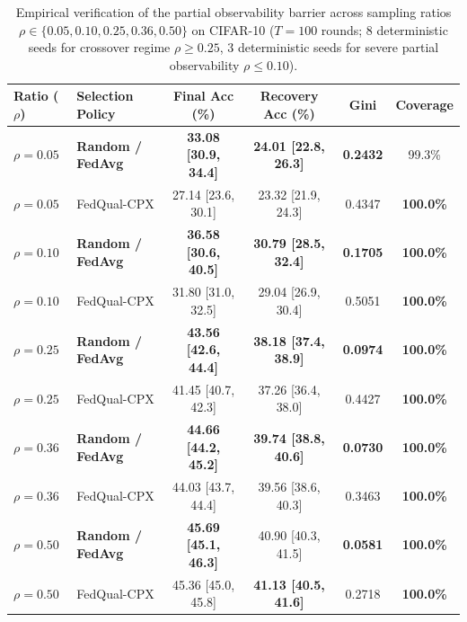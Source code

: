 \documentclass[conference]{IEEEtran}
\begin{document}
\begin{table}[h]
\centering
\caption{Empirical verification of the partial observability barrier across sampling ratios $\rho \in \{0.05, 0.10, 0.25, 0.36, 0.50\}$ on CIFAR-10 ($T=100$ rounds; 8 deterministic seeds for crossover regime $\rho \ge 0.25$, 3 deterministic seeds for severe partial observability $\rho \le 0.10$).}
\label{tab:kn_results}
\begin{tabular}{llcccc}
\toprule
Ratio ($\rho$) & Selection Policy & Final Acc (\%) & Recovery Acc (\%) & Gini & Coverage \\
\midrule
$\rho = 0.05$ & \textbf{Random / FedAvg} & \textbf{33.08 [30.9, 34.4]} & \textbf{24.01 [22.8, 26.3]} & \textbf{0.2432} & 99.3\% \\
$\rho = 0.05$ & FedQual-CPX & 27.14 [23.6, 30.1] & 23.32 [21.9, 24.3] & 0.4347 & \textbf{100.0\%} \\
$\rho = 0.10$ & \textbf{Random / FedAvg} & \textbf{36.58 [30.6, 40.5]} & \textbf{30.79 [28.5, 32.4]} & \textbf{0.1705} & \textbf{100.0\%} \\
$\rho = 0.10$ & FedQual-CPX & 31.80 [31.0, 32.5] & 29.04 [26.9, 30.4] & 0.5051 & \textbf{100.0\%} \\
$\rho = 0.25$ & \textbf{Random / FedAvg} & \textbf{43.56 [42.6, 44.4]} & \textbf{38.18 [37.4, 38.9]} & \textbf{0.0974} & \textbf{100.0\%} \\
$\rho = 0.25$ & FedQual-CPX & 41.45 [40.7, 42.3] & 37.26 [36.4, 38.0] & 0.4427 & \textbf{100.0\%} \\
$\rho = 0.36$ & \textbf{Random / FedAvg} & \textbf{44.66 [44.2, 45.2]} & \textbf{39.74 [38.8, 40.6]} & \textbf{0.0730} & \textbf{100.0\%} \\
$\rho = 0.36$ & FedQual-CPX & 44.03 [43.7, 44.4] & 39.56 [38.6, 40.3] & 0.3463 & \textbf{100.0\%} \\
$\rho = 0.50$ & \textbf{Random / FedAvg} & \textbf{45.69 [45.1, 46.3]} & 40.90 [40.3, 41.5] & \textbf{0.0581} & \textbf{100.0\%} \\
$\rho = 0.50$ & FedQual-CPX & 45.36 [45.0, 45.8] & \textbf{41.13 [40.5, 41.6]} & 0.2718 & \textbf{100.0\%} \\
\bottomrule
\end{tabular}
\end{table}
\end{document}
